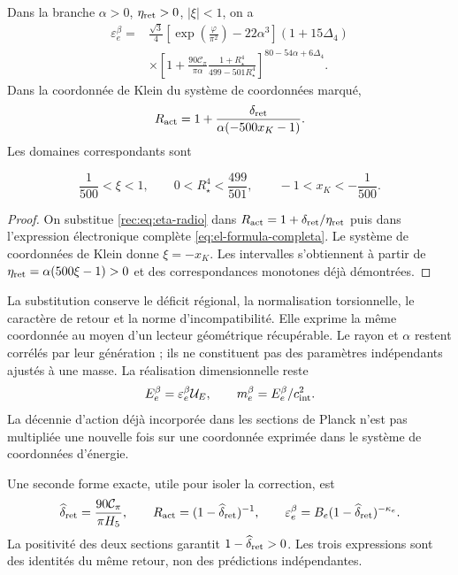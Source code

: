 \begin{corollary}
\label{rec:cor:electron}
Dans la branche \(\alpha>0\), \(\eta_{\rm ret}>0\), \(|\xi|<1\), on a
\begin{align}
 \varepsilon_e^{\beta}={}&
 \frac{\sqrt3}{4}
 \left[\exp\!\left(\frac\varphi{\pi^2}\right)-22\alpha^3\right]
 (1+15\Delta_4)\nonumber\\
 &\times\left[1+\frac{90\mathcal C_\pi}{\pi\alpha}
 \frac{1+R_\star^4}{499-501R_\star^4}\right]^{80-54\alpha+6\Delta_4}.
 \label{rec:eq:electron-radio}
\end{align}
Dans la coordonnée de Klein du système de coordonnées marqué,
\begin{equation}
 R_{\rm act}=1+
 \frac{\delta_{\rm ret}}{\alpha(-500x_K-1)}.
 \label{rec:eq:accion-klein}
\end{equation}
Les domaines correspondants sont

\[
 \frac1{500}<\xi<1,\qquad
 0<R_\star^4<\frac{499}{501},\qquad
 -1<x_K<-\frac1{500}.
\]
\end{corollary}
\begin{proof}
On substitue \eqref{rec:eq:eta-radio} dans \(R_{\rm act}=1+\delta_{\rm ret}/\eta_{\rm ret}\) puis dans l’expression électronique complète \eqref{eq:el-formula-completa}. Le système de coordonnées de Klein donne \(\xi=-x_K\). Les intervalles s’obtiennent à partir de \(\eta_{\rm ret}=\alpha(500\xi-1)>0\) et des correspondances monotones déjà démontrées.
\end{proof}

La substitution conserve le déficit régional, la normalisation torsionnelle, le caractère de retour et la norme d'incompatibilité. Elle exprime la même coordonnée au moyen d'un lecteur géométrique récupérable. Le rayon et \(\alpha\) restent corrélés par leur génération ; ils ne constituent pas des paramètres indépendants ajustés à une masse. La réalisation dimensionnelle reste
\[
 E_e^{\beta}=\varepsilon_e^{\beta}\mathcal U_E,\qquad
 m_e^{\beta}=E_e^{\beta}/c_{\rm int}^2.
\]
La décennie d’action déjà incorporée dans les sections de Planck n’est pas multipliée une nouvelle fois sur une coordonnée exprimée dans le système de coordonnées d’énergie.

Une seconde forme exacte, utile pour isoler la correction, est
\[
 \widehat\delta_{\rm ret}=\frac{90\mathcal C_\pi}{\pi H_5},\qquad
 R_{\rm act}=(1-\widehat\delta_{\rm ret})^{-1},\qquad
 \varepsilon_e^{\beta}=B_e(1-\widehat\delta_{\rm ret})^{-\kappa_e}.
\]
La positivité des deux sections garantit \(1-\widehat\delta_{\rm ret}>0\). Les trois expressions sont des identités du même retour, non des prédictions indépendantes.


